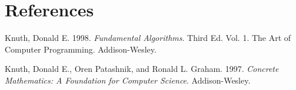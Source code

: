 \documentclass[20pt,]{extarticle}
\begin{document}
\section*{References}\label{references}

\hypertarget{refs}{}
\hypertarget{ref-taocp1}{}
Knuth, Donald E. 1998. \emph{Fundamental Algorithms}. Third Ed. Vol. 1.
The Art of Computer Programming. Addison-Wesley.

\hypertarget{ref-concrete}{}
Knuth, Donald E., Oren Patashnik, and Ronald L. Graham. 1997.
\emph{Concrete Mathematics: A Foundation for Computer Science}.
Addison-Wesley.
\end{document}
